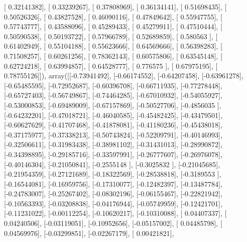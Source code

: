 \documentclass{article}
\begin{document}
       [ 0.32141382],
       [ 0.33239267],
       [ 0.37808969],
       [ 0.36134141],
       [ 0.51698435],
       [ 0.50526326],
       [ 0.43827528],
       [ 0.46090116],
       [ 0.47849642],
       [ 0.55947755],
       [ 0.57743777],
       [ 0.43588096],
       [ 0.45289433],
       [ 0.45279911],
       [ 0.47510444],
       [ 0.50590538],
       [ 0.50193722],
       [ 0.57966789],
       [ 0.52689859],
       [ 0.580563  ],
       [ 0.61402949],
       [ 0.55104188],
       [ 0.55623666],
       [ 0.64569666],
       [ 0.56398283],
       [ 0.71508257],
       [ 0.60261256],
       [ 0.78362143],
       [ 0.60575806],
       [ 0.63545148],
       [ 0.62724218],
       [ 0.63994857],
       [ 0.64528777],
       [ 0.776575  ],
       [ 0.67975195],
       [ 0.78755126]]), array([[-0.73941492],
       [-0.66174552],
       [-0.64207458],
       [-0.63961278],
       [-0.65485595],
       [-0.72952687],
       [-0.60396708],
       [-0.66711935],
       [-0.77278448],
       [-0.65727403],
       [-0.56749867],
       [-0.74464285],
       [-0.67010932],
       [-0.54055927],
       [-0.53000853],
       [-0.69489009],
       [-0.67157869],
       [-0.50527706],
       [-0.4856035 ],
       [-0.64232201],
       [-0.47018721],
       [-0.46040585],
       [-0.45482425],
       [-0.43479501],
       [-0.60627629],
       [-0.41707468],
       [-0.41878081],
       [-0.41180236],
       [-0.45438018],
       [-0.37175977],
       [-0.37338213],
       [-0.50743824],
       [-0.52209791],
       [-0.40146993],
       [-0.32506611],
       [-0.31983438],
       [-0.38981102],
       [-0.31431013],
       [-0.28990872],
       [-0.34398895],
       [-0.29185716],
       [-0.33597991],
       [-0.26777607],
       [-0.26976078],
       [-0.40146304],
       [-0.21050841],
       [-0.2555148 ],
       [-0.3025832 ],
       [-0.21045685],
       [-0.21954359],
       [-0.27121689],
       [-0.18322569],
       [-0.28538818],
       [-0.3189553 ],
       [-0.16544081],
       [-0.16959756],
       [-0.17310077],
       [-0.12482397],
       [-0.13487784],
       [-0.24783007],
       [-0.25267402],
       [-0.08302196],
       [-0.06155467],
       [-0.22821942],
       [-0.10563393],
       [-0.03208838],
       [-0.04176944],
       [-0.05749959],
       [-0.12421701],
       [-0.11231022],
       [-0.00112254],
       [-0.10620217],
       [-0.10310088],
       [ 0.04407337],
       [ 0.04240506],
       [-0.03119051],
       [-0.10952656],
       [-0.05157002],
       [ 0.04485798],
       [ 0.04569976],
       [-0.03299851],
       [-0.02267179],
       [ 0.00421821],
\end{document}

